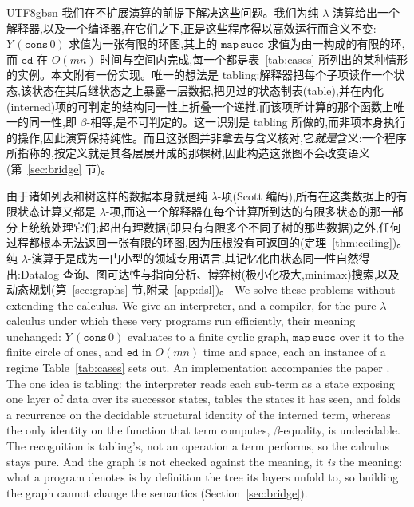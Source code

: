 \begin{CJK*}{UTF8}{gbsn}
  \ifTablambdaChinese
  我们在不扩展演算的前提下解决这些问题。我们为纯 $\lambda$-演算给出一个解释器,以及一个编译器,在它们之下,正是这些程序得以高效运行而含义不变:$Y\,(\mathtt{cons}\,0)$ 求值为一张有限的环图,其上的 $\mathtt{map}\,\mathtt{succ}$ 求值为由一构成的有限的环,而 $\mathtt{ed}$ 在 $O(mn)$ 时间与空间内完成,每一个都是表~\ref{tab:cases} 所列出的某种情形的实例。本文附有一份实现。唯一的想法是 tabling:解释器把每个子项读作一个状态,该状态在其后继状态之上暴露一层数据,把见过的状态制表(table),并在内化(interned)项的可判定的结构同一性上折叠一个递推,而该项所计算的那个函数上唯一的同一性,即 $\beta$-相等,是不可判定的。这一识别是 tabling 所做的,而非项本身执行的操作,因此演算保持纯性。而且这张图并非拿去与含义核对,它\emph{就是}含义:一个程序所指称的,按定义就是其各层展开成的那棵树,因此构造这张图不会改变语义(第~\ref{sec:bridge} 节)。

  由于诸如列表和树这样的数据本身就是纯 $\lambda$-项(Scott 编码),所有在这类数据上的有限状态计算又都是 $\lambda$-项,而这一个解释器在每个计算所到达的有限多状态的那一部分上统统处理它们;超出有理数据(即只有有限多个不同子树的那些数据)之外,任何过程都根本无法返回一张有限的环图,因为压根没有可返回的(定理~\ref{thm:ceiling})。纯 $\lambda$-演算于是成为一门小型的领域专用语言,其记忆化由状态同一性自然得出:Datalog 查询、图可达性与指向分析、博弈树(极小化极大,minimax)搜索,以及动态规划(第~\ref{sec:graphs} 节,附录~\ref{app:dsl})。
  \else
  We solve these problems without extending the calculus. We give an interpreter, and a compiler, for the pure $\lambda$-calculus under which these very programs run efficiently, their meaning unchanged: $Y\,(\mathtt{cons}\,0)$ evaluates to a finite cyclic graph, $\mathtt{map}\,\mathtt{succ}$ over it to the finite circle of ones, and $\mathtt{ed}$ in $O(mn)$ time and space, each an instance of a regime Table~\ref{tab:cases} sets out. An implementation accompanies the paper . The one idea is tabling: the interpreter reads each sub-term as a state exposing one layer of data over its successor states, tables the states it has seen, and folds a recurrence on the decidable structural identity of the interned term, whereas the only identity on the function that term computes, $\beta$-equality, is undecidable. The recognition is tabling's, not an operation a term performs, so the calculus stays pure. And the graph is not checked against the meaning, it \emph{is} the meaning: what a program denotes is by definition the tree its layers unfold to, so building the graph cannot change the semantics (Section~\ref{sec:bridge}).


\end{CJK*}
